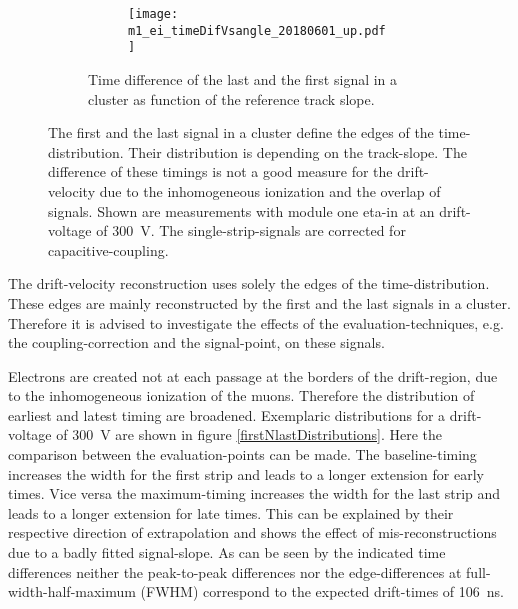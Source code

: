\documentclass[
twoside,            %
BCOR1.4cm,          %
10pt,               %
headings=normal,    %
headsepline,        %
clearplainpage,		%
final,              %
div=14,
open=right,
bibliography=toc
]{scrreprt}
\begin{document}
\begin{figure}[!h]
\begin{subfigure}[b]{\textwidth}
\begin{subfigure}[b]{0.32\textwidth}
			\centering
			\texttt{[image: m1\_ei\_timeDifVsangle\_20180601\_up.pdf]}
		\end{subfigure}
		\caption{
			Time difference of the last and the first signal in a cluster as function of the reference track slope.
		}
		\label{firstNlastDifference}
	\end{subfigure}
	\vspace{-4mm}
	\caption{
		The first and the last signal in a cluster define the edges of the time-distribution.
		Their distribution is depending on the track-slope.
		The difference of these timings is not a good measure for the drift-velocity due to the inhomogeneous ionization and the overlap of signals.
		Shown are measurements with module one eta-in at an drift-voltage of \SI{300}{V}.
		The single-strip-signals are corrected for capacitive-coupling.
	}
	\label{firstNlastOverview} 
\end{figure}

The drift-velocity reconstruction uses solely the edges of the time-distribution.
These edges are mainly reconstructed by the first and the last signals in a cluster.
Therefore it is advised to investigate the effects of the evaluation-techniques, e.g. the coupling-correction and the signal-point, on these signals.

Electrons are created not at each passage at the borders of the drift-region, due to the inhomogeneous ionization of the muons.
Therefore the distribution of earliest and latest timing are broadened.
Exemplaric distributions for a drift-voltage of \SI{300}{V} are shown in figure \ref{firstNlastDistributions}.
Here the comparison between the evaluation-points can be made.
The baseline-timing increases the width for the first strip and leads to a longer extension for early times.
Vice versa the maximum-timing increases the width for the last strip and leads to a longer extension for late times.
This can be explained by their respective direction of extrapolation and shows the effect of mis-reconstructions due to a badly fitted signal-slope.
As can be seen by the indicated time differences neither the peak-to-peak differences nor the edge-differences at full-width-half-maximum (FWHM) correspond to the expected drift-times of \SI{106}{ns}.
\end{document}
